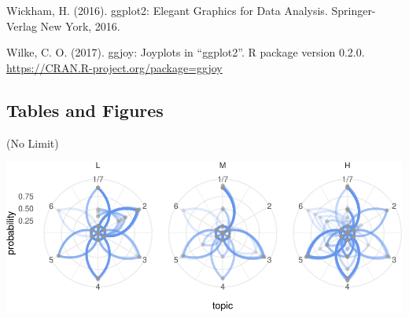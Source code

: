 \documentclass[doc]{apa6}
\theoremstyle{definition}
\theoremstyle{definition}
\theoremstyle{definition}
\theoremstyle{remark}
\begin{document}
Wickham, H. (2016). ggplot2: Elegant Graphics for Data Analysis.
Springer-Verlag New York, 2016.

Wilke, C. O. (2017). ggjoy: Joyplots in \enquote{ggplot2}. R package
version 0.2.0. \url{https://CRAN.R-project.org/package=ggjoy}

\hypertarget{tables-and-figures}{%
\subsection{Tables and Figures}\label{tables-and-figures}}

(No Limit)

\includegraphics{ncme19_files/figure-latex/modeling-1.pdf}
\end{document}
